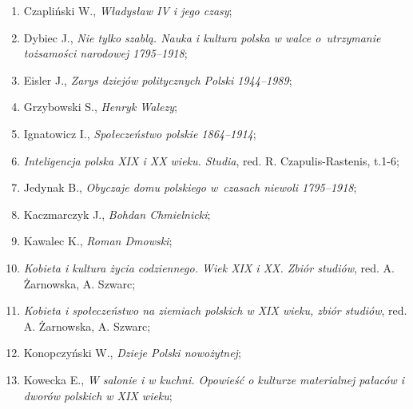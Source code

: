 \documentclass[a4paper,11pt]{article}
\begin{document}
\begin{enumerate}
\item Czapliński W., \textit{Władysław IV i jego czasy};



\item Dybiec J., \textit{Nie tylko szablą. Nauka i kultura polska w
    walce o~utrzymanie tożsamości narodowej 1795--1918};



\item Eisler J., \textit{Zarys dziejów politycznych Polski 1944--1989};



\item Grzybowski S., \textit{Henryk Walezy};



\item Ignatowicz I., \textit{Społeczeństwo polskie 1864--1914};



\item \textit{Inteligencja polska XIX i XX wieku. Studia}, red. R.
  Czapulis-Rastenis, t.1-6;



\item Jedynak B., \textit{Obyczaje domu polskiego w~czasach niewoli
    1795--1918};



\item Kaczmarczyk J., \textit{Bohdan Chmielnicki};



\item Kawalec K., \textit{Roman Dmowski};



\item \textit{Kobieta i kultura życia codziennego. Wiek XIX i XX. Zbiór
    studiów}, red. A. Żarnowska, A. Szwarc;



\item \textit{Kobieta i społeczeństwo na ziemiach polskich w XIX wieku,
    zbiór studiów}, red. A. Żarnowska, A. Szwarc;



\item Konopczyński W., \textit{Dzieje Polski nowożytnej};



\item Kowecka E., \textit{W salonie i w kuchni. Opowieść o kulturze
    materialnej pałaców i dworów polskich w XIX wieku};




\end{enumerate}
\end{document}
